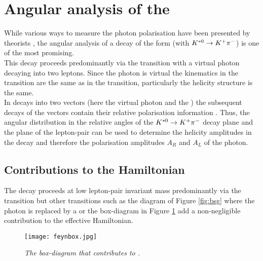\section{Angular analysis of the \BdKstee}
\label{sec:ksll}
While various ways to measure the photon polarisation have been presented by theorists \cite{ananote} \cite{gross}, the angular analysis of a decay of the form \BdKstll (with $K^{*0} \rightarrow K^+ \pi^-$) is one of the most promising.\\
This decay proceeds predominantly via the \bsll transition with a virtual photon decaying into two leptons. Since the photon is virtual the kinematics in the \bsll transition are the same as in the \bsg transition, particularly the helicity structure is the same.\\
In \B decays into two vectors (here the virtual photon and the \Kstarz) the subsequent decays of the vectors contain their relative polarisation information \cite{krueger}. Thus, the angular distribution in the relative angles of the $K^{*0} \rightarrow K^+ \pi^-$ decay plane and the plane of the lepton-pair can be used to determine the helicity amplitudes in the \BdKstll decay and therefore the polarisation amplitudes $A_R$ and ${A_L}$ of the photon.\\

\subsection{Contributions to the \BdKstll Hamiltonian}
The \BdKstll decay proceeds at low lepton-pair invariant mass predominantly via the \bsll transition but other transitions such as the diagram of Figure \ref{fig:bsg} where the photon is replaced by a \Z or the box-diagram in Figure \ref{fig:feynbox} add a non-negligible contribution to the effective Hamiltonian.
\begin{figure}[ht]
\begin{center}
  	\vspace*{-0.5cm}
    \texttt{[image: feynbox.jpg]}
  \vspace*{-1cm}
  \end{center}
  \caption{\textit{The box-diagram that contributes to \BdKstll.}}
  \label{fig:feynbox}
\vspace*{-0.5cm}
\end{figure}


